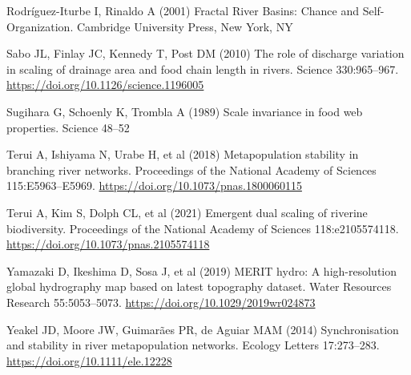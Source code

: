 \documentclass[
  12pt,
]{article}
\newlength{\cslhangindent}
\newlength{\cslentryspacingunit} %
\newenvironment{CSLReferences}[2] %
 {%
  \setlength{\parindent}{0pt}
  \ifodd #1
  \let\oldpar\par
  \def\par{\hangindent=\cslhangindent\oldpar}
  \fi
  \setlength{\parskip}{#2\cslentryspacingunit}
 }%
 {}
\begin{document}
\begin{CSLReferences}{1}{0}
\leavevmode{}%
Rodríguez-Iturbe I, Rinaldo A (2001) Fractal {River Basins}: {Chance} and {Self-Organization}. {Cambridge University Press}, {New York, NY}

\leavevmode{}%
Sabo JL, Finlay JC, Kennedy T, Post DM (2010) The role of discharge variation in scaling of drainage area and food chain length in rivers. Science 330:965--967. \url{https://doi.org/10.1126/science.1196005}

\leavevmode{}%
Sugihara G, Schoenly K, Trombla A (1989) Scale invariance in food web properties. Science 48--52

\leavevmode{}%
Terui A, Ishiyama N, Urabe H, et al (2018) Metapopulation stability in branching river networks. Proceedings of the National Academy of Sciences 115:E5963--E5969. \url{https://doi.org/10.1073/pnas.1800060115}

\leavevmode{}%
Terui A, Kim S, Dolph CL, et al (2021) Emergent dual scaling of riverine biodiversity. Proceedings of the National Academy of Sciences 118:e2105574118. \url{https://doi.org/10.1073/pnas.2105574118}

\leavevmode{}%
Yamazaki D, Ikeshima D, Sosa J, et al (2019) {MERIT} hydro: A high-resolution global hydrography map based on latest topography dataset. Water Resources Research 55:5053--5073. \url{https://doi.org/10.1029/2019wr024873}

\leavevmode{}%
Yeakel JD, Moore JW, Guimarães PR, de Aguiar MAM (2014) Synchronisation and stability in river metapopulation networks. Ecology Letters 17:273--283. \url{https://doi.org/10.1111/ele.12228}

\end{CSLReferences}
\end{document}
